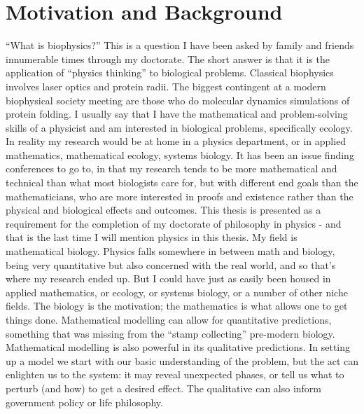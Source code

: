 \section{Motivation and Background}%
``What is biophysics?''
This is a question I have been asked by family and friends innumerable times through my doctorate. 
The short answer is that it is the application of ``physics thinking'' to biological problems. 
Classical biophysics involves laser optics and protein radii. 
The biggest contingent at a modern biophysical society meeting are those who do molecular dynamics simulations of protein folding. 
I usually say that I have the mathematical and problem-solving skills of a physicist and am interested in biological problems, specifically ecology. 
In reality my research would be at home in a physics department, or in applied mathematics, mathematical ecology, systems biology. 
It has been an issue finding conferences to go to, in that my research tends to be more mathematical and technical than what most biologists care for, but with different end goals than the mathematicians, who are more interested in proofs and existence rather than the physical and biological effects and outcomes. 
This thesis is presented as a requirement for the completion of my doctorate of philosophy in physics - and that is the last time I will mention physics in this thesis. 
My field is mathematical biology. 
Physics falls somewhere in between math and biology, being very quantitative but also concerned with the real world, and so that’s where my research ended up. 
But I could have just as easily been housed in applied mathematics, or ecology, or systems biology, or a number of other niche fields. 
The biology is the motivation; the mathematics is what allows one to get things done. 
Mathematical modelling can allow for quantitative predictions, something that was missing from the “stamp collecting” pre-modern biology. 
Mathematical modelling is also powerful in its qualitative predictions. 
In setting up a model we start with our basic understanding of the problem, but the act can enlighten us to the system: it may reveal unexpected phases, or tell us what to perturb (and how) to get a desired effect. %
The qualitative can also inform government policy or life philosophy. %

